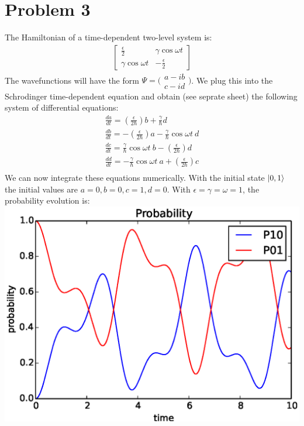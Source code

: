 \documentclass[a4paper,12pt]{article}
\numberwithin{equation}{section}
\begin{document}
\section{Problem 3}
The Hamiltonian of a time-dependent two-level system is:
\begin{gather}
 \begin{bmatrix}
  \frac{\epsilon}{2} & \gamma \cos \omega t\\
  \gamma \cos \omega t   & -\frac{\epsilon}{2}
 \end{bmatrix}
\end{gather}
The wavefunctions will have the form $\Psi = \bigl( \begin{smallmatrix}a-ib \\ c-id \end{smallmatrix} \bigr)$.
We plug this into the Schrodinger time-dependent equation and obtain (see seprate sheet) the following system of differential equations:
\begin{align}
 \frac{da}{dt}=(\frac{\epsilon}{2 \hbar})b+\frac{\gamma}{\hbar}d\\
 \frac{db}{dt}=-(\frac{\epsilon}{2 \hbar})a-\frac{\gamma}{\hbar}\cos{\omega t}\ d\\
 \frac{dc}{dt}=\frac{\gamma}{\hbar}\cos{\omega t}\ b -(\frac{\epsilon}{2 \hbar})d\\
 \frac{dd}{dt}=-\frac{\gamma}{\hbar}\cos{\omega t}\ a +(\frac{\epsilon}{2 \hbar})c\\
\end{align}
We can now integrate these equations numerically. 
With the initial state $\ket{0,1}$ the initial values are $a=0,b=0,c=1,d=0$.
With $\epsilon=\gamma=\omega=1$, the probability evolution is:\\
\includegraphics{p3_e1y1w1}
\end{document}
